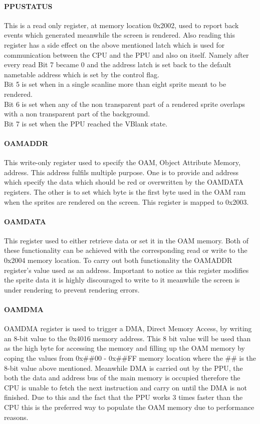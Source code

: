 \documentclass[]{report}
\begin{document}
\paragraph{PPUSTATUS}
This is a read only register, at memory location 0x2002, used to report back events which generated meanwhile the screen is rendered. Also reading this register has a side effect on the above mentioned latch which is used for communication between the CPU and the PPU and also on itself. Namely after every read Bit 7 became 0 and the address latch is set back to the default nametable address which is set by the control flag.
\\
Bit 5 is set when in a single scanline more than eight sprite meant to be rendered.
\\
Bit 6 is set when any of the non transparent part of a rendered sprite overlaps with a non transparent part of the background.
\\
Bit 7 is set when the PPU reached the VBlank state.

\paragraph{OAMADDR}
This write-only register used to specify the OAM, Object Attribute Memory, address. This address fulfils multiple purpose. One is to provide and address which specify the data which should be red or overwritten by the OAMDATA registers. The other is to set which byte is the first byte used in the OAM ram when the sprites are rendered on the screen. This register is mapped to 0x2003.

\paragraph{OAMDATA}
This register used to either retrieve data or set it in the OAM memory. Both of these functionality can be achieved with the corresponding read or write to the 0x2004 memory location. To carry out both functionality the OAMADDR register's value used as an address. Important to notice as this register modifies the sprite data it is highly discouraged to write to it meanwhile the screen is under rendering to prevent rendering errors.

\paragraph{OAMDMA}
OAMDMA register is used to trigger a DMA, Direct Memory Access, by writing an 8-bit value to the 0x4016 memory address. This 8 bit value will be used than as the high byte for accessing the memory and filling up the OAM memory by coping the values from 0x\#\#00 - 0x\#\#FF memory location where the \#\# is the 8-bit value above mentioned. Meanwhile DMA is carried out by the PPU, the both the data and address bus of the main memory is occupied therefore the CPU is unable to fetch the next instruction and carry on until the DMA is not finished. Due to this and the fact that the PPU works 3 times faster than the CPU this is the preferred way to populate the OAM memory due to performance reasons.
\end{document}
